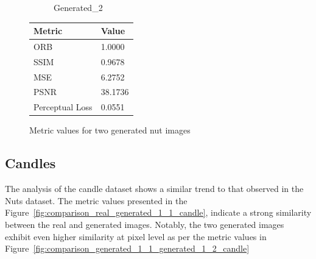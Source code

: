 \documentclass[12pt,DIV14,BCOR12mm,a4paper,footinclude=false,headinclude,parskip=half-,twoside,openright,cleardoublepage=empty,toc=index,bibliography=totoc,listof=totoc]{scrreprt}
\numberwithin{equation}{chapter}
\begin{document}
\begin{figure}
\begin{minipage}[H]{\linewidth}
\begin{minipage}[H]{0.5\linewidth}
\begin{subfigure}[t]{0.48\linewidth}
                \caption{Generated\_2}
            \end{subfigure}
        \end{minipage}%
        \hfill
        \begin{minipage}[H]{0.5\linewidth} %
            \centering
            \small
            \begin{tabular}{p{3cm} p{2cm}}
                \toprule
                \textbf{Metric} & \textbf{Value} \\
                \midrule
                ORB             & 1.0000        \\
                SSIM            & 0.9678        \\
                MSE             & 6.2752        \\
                PSNR            & 38.1736       \\
                Perceptual Loss & 0.0551        \\
                \bottomrule
            \end{tabular}
        \end{minipage}%
        \caption{Metric values for two generated nut images}
        \label{fig:comparison_metrics_two_generated_nut}
    \end{minipage}
\end{figure}


\subsection{Candles}

The analysis of the candle dataset shows a similar trend to that observed in the Nuts dataset. The metric values presented in the Figure~\ref{fig:comparison_real_generated_1_1_candle}, indicate a strong similarity between the real and generated images. Notably, the two generated images exhibit even higher similarity at pixel level as per the metric values in Figure~\ref{fig:comparison_generated_1_1_generated_1_2_candle}
\end{document}
